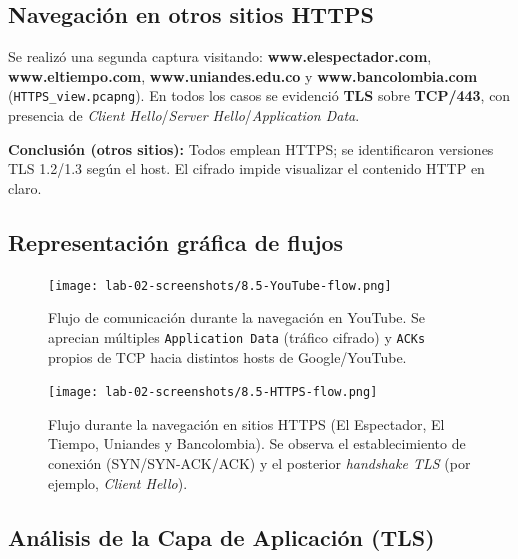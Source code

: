 \documentclass[10pt]{article}
\begin{document}
\subsection{Navegación en otros sitios HTTPS}
Se realizó una segunda captura visitando: \textbf{www.elespectador.com}, \textbf{www.eltiempo.com}, \textbf{www.uniandes.edu.co} y \textbf{www.bancolombia.com} (\texttt{HTTPS\_view.pcapng}). 
En todos los casos se evidenció \textbf{TLS} sobre \textbf{TCP/443}, con presencia de \textit{Client Hello}/\textit{Server Hello}/\textit{Application Data}.

\noindent\textbf{Conclusión (otros sitios):}
Todos emplean HTTPS; se identificaron versiones TLS 1.2/1.3 según el host. 
El cifrado impide visualizar el contenido HTTP en claro.

\subsection*{Representación gráfica de flujos}

\begin{figure}[H]
    \centering
    \texttt{[image: lab-02-screenshots/8.5-YouTube-flow.png]}
    \caption{Flujo de comunicación durante la navegación en YouTube. Se aprecian múltiples \texttt{Application Data} (tráfico cifrado) y \texttt{ACKs} propios de TCP hacia distintos hosts de Google/YouTube.}
\end{figure}

\begin{figure}[H]
    \centering
    \texttt{[image: lab-02-screenshots/8.5-HTTPS-flow.png]}
    \caption{Flujo durante la navegación en sitios HTTPS (El Espectador, El Tiempo, Uniandes y Bancolombia). Se observa el establecimiento de conexión (SYN/SYN-ACK/ACK) y el posterior \textit{handshake TLS} (por ejemplo, \textit{Client Hello}).}
\end{figure}

\subsection*{Análisis de la Capa de Aplicación (TLS)}
\end{document}
